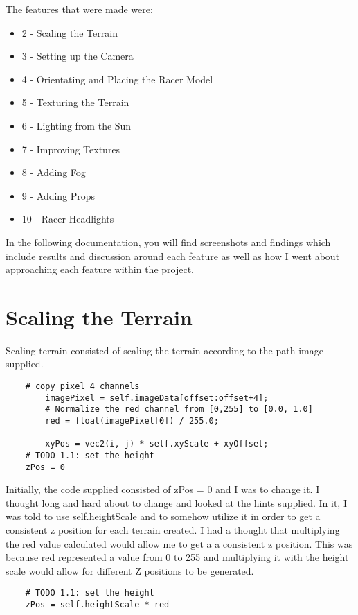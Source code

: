 \documentclass[11pt, oneside, a4paper]{article}
\begin{document}
The features that were made were:
\begin{itemize}
	\item{2 - Scaling the Terrain}
	\item{3 - Setting up the Camera}
	\item{4 - Orientating and Placing the Racer Model}
	\item{5 - Texturing the Terrain}
	\item{6 - Lighting from the Sun}
	\item{7 - Improving Textures}
    \item{8 - Adding Fog}
    \item{9 - Adding Props} 
    \item{10 - Racer Headlights}
\end{itemize}


In the following documentation, you will find screenshots and findings which include results and discussion around each feature as well as how I went about approaching each feature within the project. 

\section{Scaling the Terrain}
Scaling terrain consisted of scaling the terrain according to the path image supplied.
\begin{lstlisting}    
	# copy pixel 4 channels
        imagePixel = self.imageData[offset:offset+4];
        # Normalize the red channel from [0,255] to [0.0, 1.0]
        red = float(imagePixel[0]) / 255.0;

        xyPos = vec2(i, j) * self.xyScale + xyOffset;
	# TODO 1.1: set the height
	zPos = 0
\end{lstlisting}

Initially, the code supplied consisted of zPos = 0 and I was to change it. I thought long and hard about to change and looked at the hints supplied. In it, I was told to use self.heightScale and to somehow utilize it in order to get a consistent z position for each terrain created. I had a thought that multiplying the red value calculated would allow me to get a a consistent z position. This was because red represented a value from 0 to 255 and multiplying it with the height scale would allow for different Z positions to be generated.

\begin{lstlisting}    
	# TODO 1.1: set the height
	zPos = self.heightScale * red
\end{lstlisting}
\end{document}
